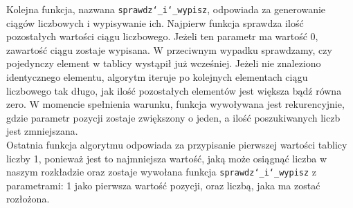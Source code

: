 \documentclass[UTF8]{article}
\begin{document}
Kolejna funkcja, nazwana  \texttt{sprawdz\char`_i\char`_wypisz}, odpowiada za generowanie ciągów liczbowych i wypisywanie ich. Najpierw funkcja sprawdza ilość pozostałych wartości ciągu liczbowego. Jeżeli ten parametr ma wartość 0, zawartość ciągu zostaje wypisana. W przeciwnym wypadku sprawdzamy, czy pojedynczy element w tablicy wystąpił już wcześniej. Jeżeli nie znaleziono identycznego elementu, algorytm iteruje po kolejnych elementach ciągu liczbowego tak długo, jak ilość pozostałych elementów jest większa bądź równa zero. W momencie spełnienia warunku, funkcja wywoływana jest rekurencyjnie, gdzie parametr pozycji zostaje zwiększony o jeden, a ilość poszukiwanych liczb jest zmniejszana.~\\

Ostatnia funkcja algorytmu odpowiada za przypisanie pierwszej wartości tablicy liczby 1, ponieważ jest to najmniejsza wartość, jaką może osiągnąć liczba w naszym rozkładzie oraz zostaje wywołana funkcja \texttt{sprawdz\char`_i\char`_wypisz} z parametrami: 1 jako pierwsza wartość pozycji, oraz liczbą, jaka ma zostać rozłożona.~\\
\end{document}
